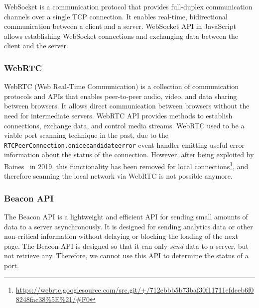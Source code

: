 WebSocket is a communication protocol that provides full-duplex communication channels over a single TCP connection. It enables real-time, bidirectional communication between a client and a server. WebSocket API in JavaScript allows establishing WebSocket connections and exchanging data between the client and the server.


\subsubsection{WebRTC}

WebRTC (Web Real-Time Communication) is a collection of communication protocols and APIs that enables peer-to-peer audio, video, and data sharing between browsers. It allows direct communication between browsers without the need for intermediate servers. WebRTC API provides methods to establish connections, exchange data, and control media streams.
WebRTC used to be a viable port scanning technique in the past, due to the \texttt{RTCPeerConnection.onicecandidateerror} event handler emitting useful error information about the status of the connection. However, after being exploited by Baines~ in 2019, 
this functionality has been removed for local connections\footnote{\url{https://webrtc.googlesource.com/src.git/+/712ebbb5b73baf30f11711efdceb6f08248fac38\%5E\%21/\#F0}}, and therefore scanning the local network via WebRTC is not possible anymore.

\subsubsection{Beacon API}

The Beacon API is a lightweight and efficient API for sending small amounts of data to a server asynchronously. It is designed for sending analytics data or other non-critical information without delaying or blocking the loading of the next page. The Beacon API is designed so that it can only \emph{send} data to a server, but not retrieve any. Therefore, we cannot use this API to determine the status of a port.

